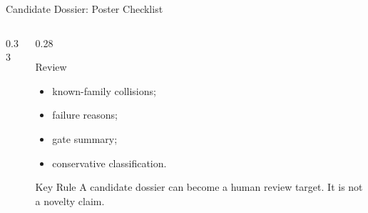 \documentclass[aspectratio=169,11pt]{beamer}
\begin{document}
\begin{frame}{Candidate Dossier: Poster Checklist}
\begin{columns}[T,totalwidth=\textwidth]
\begin{column}{0.33\textwidth}
    \end{column}
    \begin{column}{0.28\textwidth}
      \begin{block}{Review}
        \begin{itemize}
          \item known-family collisions;
          \item failure reasons;
          \item gate summary;
          \item conservative classification.
        \end{itemize}
      \end{block}
      \begin{alertblock}{Key Rule}
        A candidate dossier can become a human review target. It is not a
        novelty claim.
      \end{alertblock}
    \end{column}
  \end{columns}
\end{frame}
\end{document}
